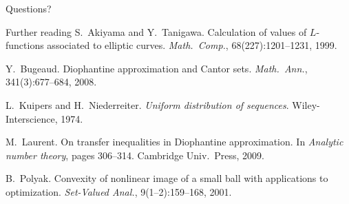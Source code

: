 \documentclass{beamer}
\begin{document}
\begin{frame}
\begin{center}
{\Huge Questions?}
\end{center}
\end{frame}

\begin{frame}{Further reading}
\small
S.~Akiyama and Y.~Tanigawa. Calculation of values of $L$-functions associated to elliptic curves. \emph{Math.~Comp.}, 68(227):1201--1231, 1999.

Y.~Bugeaud. Diophantine approximation and Cantor sets. \emph{Math.~Ann.}, 341(3):677--684, 2008. 

L.~Kuipers and H.~Niederreiter. \emph{Uniform distribution of sequences}. Wiley-Interscience, 1974. 

M.~Laurent. On transfer inequalities in Diophantine approximation. In \emph{Analytic number theory}, pages 306--314. Cambridge Univ.~Press, 2009. 

B.~Polyak. Convexity of nonlinear image of a small ball with applications to optimization. \emph{Set-Valued Anal.}, 9(1--2):159--168, 2001. 
\end{frame}
\end{document}
